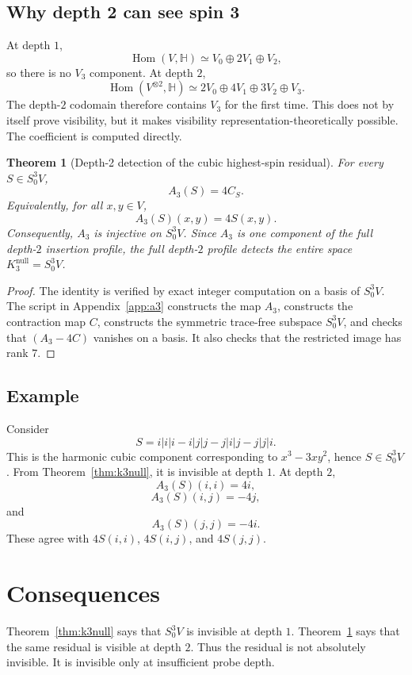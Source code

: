 \documentclass[11pt]{article}
\newtheorem{theorem}{Theorem}[section]
\theoremstyle{definition}
\newcommand{\Hom}{\operatorname{Hom}}
\begin{document}
\subsection{Why depth 2 can see spin 3}

At depth $1$,
\[
  \Hom(V,\mathbb{H})\simeq V_0\oplus2V_1\oplus V_2,
\]
so there is no $V_3$ component.
At depth $2$,
\[
  \Hom(V^{\otimes2},\mathbb{H})
  \simeq
  2V_0\oplus4V_1\oplus3V_2\oplus V_3.
\]
The depth-$2$ codomain therefore contains $V_3$ for the first time.
This does not by itself prove visibility, but it makes visibility representation-theoretically possible.
The coefficient is computed directly.

\begin{theorem}[Depth-2 detection of the cubic highest-spin residual]
\label{thm:a3}
For every $S\in S^3_0V$,
\[
  A_3(S)=4C_S.
\]
Equivalently, for all $x,y\in V$,
\[
  A_3(S)(x,y)=4S(x,y).
\]
Consequently, $A_3$ is injective on $S^3_0V$.
Since $A_3$ is one component of the full depth-$2$ insertion profile, the full depth-$2$ profile detects the entire space $K_3^{\mathrm{null}}=S^3_0V$.
\end{theorem}

\begin{proof}
The identity is verified by exact integer computation on a basis of $S^3_0V$.
The script in Appendix~\ref{app:a3} constructs the map $A_3$, constructs the contraction map $C$, constructs the symmetric trace-free subspace $S^3_0V$, and checks that $(A_3-4C)$ vanishes on a basis.
It also checks that the restricted image has rank $7$.
\end{proof}

\subsection{Example}

Consider
\[
  S=i|i|i-i|j|j-j|i|j-j|j|i.
\]
This is the harmonic cubic component corresponding to $x^3-3xy^2$, hence $S\in S^3_0V$.
From Theorem~\ref{thm:k3null}, it is invisible at depth $1$.
At depth $2$,
\[
  A_3(S)(i,i)=4i,
\]
\[
  A_3(S)(i,j)=-4j,
\]
and
\[
  A_3(S)(j,j)=-4i.
\]
These agree with $4S(i,i)$, $4S(i,j)$, and $4S(j,j)$.

\section{Consequences}

Theorem~\ref{thm:k3null} says that $S^3_0V$ is invisible at depth $1$.
Theorem~\ref{thm:a3} says that the same residual is visible at depth $2$.
Thus the residual is not absolutely invisible.
It is invisible only at insufficient probe depth.
\end{document}
